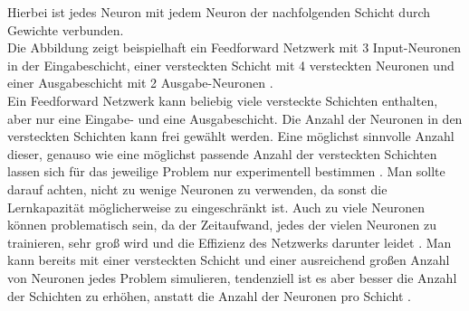 Hierbei ist jedes Neuron mit jedem Neuron der nachfolgenden Schicht durch Gewichte verbunden.\\
Die Abbildung zeigt beispielhaft ein Feedforward Netzwerk mit 3 Input-Neuronen in der Eingabeschicht, einer versteckten Schicht mit 4 versteckten Neuronen und einer Ausgabeschicht mit 2 Ausgabe-Neuronen \cite{Bishop1995}.\\
Ein Feedforward Netzwerk kann beliebig viele versteckte Schichten enthalten, aber nur eine Eingabe- und eine Ausgabeschicht. Die Anzahl der Neuronen in den versteckten Schichten kann frei gew\"ahlt werden. Eine möglichst sinnvolle Anzahl dieser, genauso wie eine möglichst passende Anzahl der versteckten Schichten lassen sich für das jeweilige Problem nur experimentell bestimmen \cite{handson}. Man sollte darauf achten, nicht zu wenige Neuronen zu verwenden, da sonst die Lernkapazit\"at m\"oglicherweise zu eingeschr\"ankt ist. Auch zu viele Neuronen k\"onnen problematisch sein, da der Zeitaufwand, jedes der vielen Neuronen zu trainieren, sehr groß wird und die Effizienz des Netzwerks darunter leidet \cite{Rashid}. Man kann bereits mit einer versteckten Schicht und einer ausreichend gro\ss en Anzahl von Neuronen jedes Problem simulieren, tendenziell ist es aber besser die Anzahl der Schichten zu erh\"ohen, anstatt die Anzahl der Neuronen pro Schicht \cite{handson}. 



